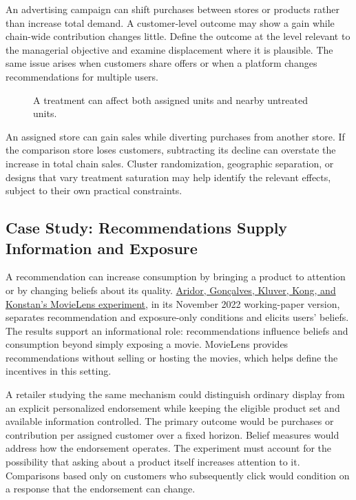 \noindent An advertising campaign can shift purchases between stores or products
rather than increase total demand. A customer-level outcome may show a
gain while chain-wide contribution changes little. Define the outcome at
the level relevant to the managerial objective and examine displacement
where it is plausible. The same issue arises when customers share offers
or when a platform changes recommendations for multiple users.

\begin{figure}[htbp]
\centering

\caption{A treatment can affect both assigned units and nearby untreated units.}\label{fig:M06_spillovers}
\end{figure}

An assigned store can gain sales while diverting purchases from another
store. If the comparison store loses customers, subtracting its decline
can overstate the increase in total chain sales. Cluster randomization,
geographic separation, or designs that vary treatment saturation may
help identify the relevant effects, subject to their own practical
constraints.

\hypertarget{M06-case-study-recommendations-supply-information-and-exposure}{%
\subsection{Case Study: Recommendations Supply Information and
Exposure}\label{M06-case-study-recommendations-supply-information-and-exposure}}

\noindent A recommendation can increase consumption by bringing a product to
attention or by changing beliefs about its quality.
\href{https://www.econstor.eu/handle/10419/271773}{Aridor, Gonçalves,
Kluver, Kong, and Konstan's MovieLens experiment}, in its November 2022
working-paper version, separates recommendation and exposure-only
conditions and elicits users' beliefs. The results support an
informational role: recommendations influence beliefs and consumption
beyond simply exposing a movie. MovieLens provides recommendations
without selling or hosting the movies, which helps define the incentives
in this setting.

A retailer studying the same mechanism could distinguish ordinary
display from an explicit personalized endorsement while keeping the
eligible product set and available information controlled. The primary
outcome would be purchases or contribution per assigned customer over a
fixed horizon. Belief measures would address how the endorsement
operates. The experiment must account for the possibility that asking
about a product itself increases attention to it. Comparisons based only
on customers who subsequently click would condition on a response that
the endorsement can change.

